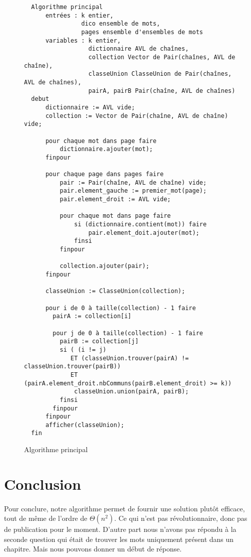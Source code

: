 \documentclass[a4paper]{article}
\begin{document}
   			\begin{figure}
	    	\begin{verbatim}
  Algorithme principal
      entrées : k entier,
                dico ensemble de mots,
                pages ensemble d'ensembles de mots
      variables : k entier,
                  dictionnaire AVL de chaînes,
                  collection Vector de Pair(chaînes, AVL de chaîne),
                  classeUnion ClasseUnion de Pair(chaînes, AVL de chaînes),
                  pairA, pairB Pair(chaîne, AVL de chaînes)
  debut
      dictionnaire := AVL vide;
      collection := Vector de Pair(chaîne, AVL de chaîne) vide;
      
      pour chaque mot dans page faire
          dictionnaire.ajouter(mot);
      finpour
          
      pour chaque page dans pages faire
          pair := Pair(chaîne, AVL de chaîne) vide;
          pair.element_gauche := premier_mot(page);
          pair.element_droit := AVL vide;
          
          pour chaque mot dans page faire
              si (dictionnaire.contient(mot)) faire
                  pair.element_doit.ajouter(mot);
              finsi
          finpour
          
          collection.ajouter(pair);
      finpour
      
      classeUnion := ClasseUnion(collection);
      
      pour i de 0 à taille(collection) - 1 faire
        pairA := collection[i]
          
        pour j de 0 à taille(collection) - 1 faire
          pairB := collection[j]
          si ( (i != j)
             ET (classeUnion.trouver(pairA) != classeUnion.trouver(pairB))
             ET (pairA.element_droit.nbCommuns(pairB.element_droit) >= k))
              classeUnion.union(pairA, pairB);
          finsi
        finpour
      finpour
      afficher(classeUnion);
  fin
	    	\end{verbatim}
   	    	\caption{Algorithme principal \label{algo_main}}
   	    	\end{figure}
	
	\newpage
			
	\section*{Conclusion}
		\paragraph{}{
		Pour conclure, notre algorithme permet de fournir une solution plutôt efficace, tout de
		même de l'ordre de $\Theta(n^{2})$. Ce qui n'est pas révolutionnaire, donc pas de publication
		pour le moment. D'autre part nous n'avons pas répondu à la seconde question qui était de trouver les
		mots uniquement présent dans un chapitre. Mais nous pouvons donner un début de réponse. 
		}
		
\end{document}
